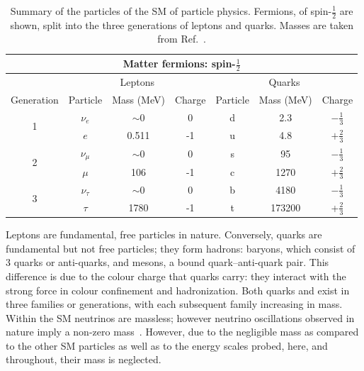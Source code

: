 \begin{table}
\begin{center}
\begin{tabular}[ht!]{c|ccc|ccc}
\hline
\multicolumn{7}{c}{Matter fermions: spin-$\frac{1}{2}$} \\ \hline
 & \multicolumn{3}{c|}{Leptons} &\multicolumn{3}{c}{Quarks} \\ 
Generation & Particle & Mass (MeV) & Charge & Particle & Mass (MeV) & Charge \\ \hline
\multirow{2}{*}{1} & $\nu_{e}$    & $\sim0$    & 0  & d & 2.3  &$-\frac{1}{3}$\\
 				   & $e$          & 0.511& -1 & u & 4.8  &$+\frac{2}{3}$\\
\multirow{2}{*}{2} & $\nu_{\mu}$  & $\sim0$    & 0  & s & 95   &$-\frac{1}{3}$\\
 				   & $\mu$        & 106  & -1 & c & 1270 &$+\frac{2}{3}$\\
\multirow{2}{*}{3} & $\nu_{\tau}$ & $\sim0$    & 0  & b & 4180 &$-\frac{1}{3}$\\
				   & $\tau$ 	  & 1780 & -1 & t & 173200 &+$\frac{2}{3}$\\ \hline
\end{tabular}
\caption{\label{tab:SMfermions}Summary of the particles of the \ac{SM} of particle physics. Fermions, of spin-$\frac{1}{2}$ are shown, split into the three generations of leptons and quarks. Masses are taken from Ref.~\cite{PDG}.}
\end{center}
\end{table}

%
Leptons are fundamental, free particles in nature. 
Conversely, quarks are fundamental but not free particles; they form hadrons: baryons, which consist of 3 quarks or anti-quarks, and mesons, a bound quark--anti-quark pair. 
This difference is due to the colour charge that quarks carry: they interact with the strong force in colour confinement and hadronization.  
Both quarks and  exist in three families or generations, with each subsequent family increasing in mass.
Within the \ac{SM} neutrinos are massless; however neutrino oscillations observed in nature imply a non-zero mass~\cite{superK}.
However, due to the negligible mass as compared to the other \ac{SM} particles as well as to the energy scales probed, here, and throughout, their mass is neglected.

